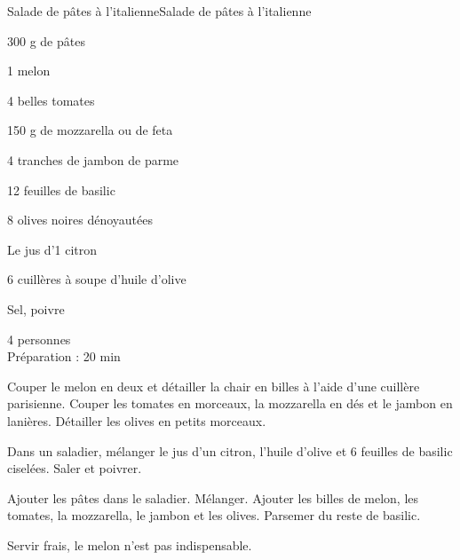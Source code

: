 \begin{recette}{Salade de pâtes à l'italienne}{Salade de pâtes à l'italienne}

\begin{ingredients}
300 g de pâtes\par
1 melon\par
4 belles tomates\par
150 g de mozzarella ou de feta\par
4 tranches de jambon de parme\par
12 feuilles de basilic\par
8 olives noires dénoyautées\par
Le jus d'1 citron\par
6 cuillères à soupe d'huile d'olive\par
Sel, poivre\par
\end{ingredients}

\begin{infos}
4 personnes\\
Préparation : 20 min\\
\end{infos}

\begin{etapes}
\item Couper le melon en deux et détailler la chair en billes à l'aide d'une cuillère parisienne. Couper les tomates en morceaux, la mozzarella en dés et le jambon en lanières. Détailler les olives en petits morceaux.
\item Dans un saladier, mélanger le jus d'un citron, l'huile d'olive et 6 feuilles de basilic ciselées. Saler et poivrer.
\item Ajouter les pâtes dans le saladier. Mélanger. Ajouter les billes de melon, les tomates, la mozzarella, le jambon et les olives. Parsemer du reste de basilic.
\end{etapes}

\begin{conseils}
Servir frais, le melon n'est pas indispensable.
\end{conseils}

\end{recette}